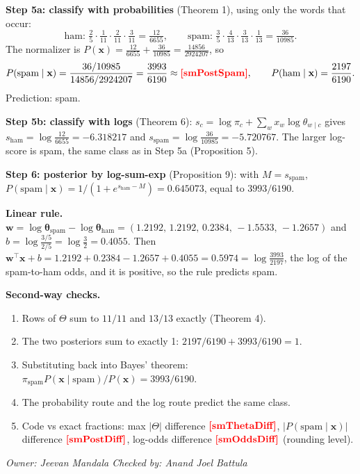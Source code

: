 \documentclass[11pt]{article}
\makeatletter
\newcommand{\fillin}[1]{\textcolor{red}{\textbf{[#1]}}}
\newcommand{\res}[1]{\ifcsname res@#1\endcsname\csname res@#1\endcsname\else\fillin{#1}\fi}
\newcommand{\owner}[2]{\par\noindent\textit{Owner: #1 \hfill Checked by: #2}\par\medskip}
\theoremstyle{plain}
\newcommand{\bx}{\mathbf{x}}
\newcommand{\bw}{\mathbf{w}}
\makeatother
\begin{document}
\textbf{Step 5a: classify with probabilities} (Theorem 1), using only the words that occur:
\[
\text{ham: }\tfrac25\cdot\tfrac1{11}\cdot\tfrac2{11}\cdot\tfrac3{11}=\tfrac{12}{6655},\qquad
\text{spam: }\tfrac35\cdot\tfrac4{13}\cdot\tfrac3{13}\cdot\tfrac1{13}=\tfrac{36}{10985}.
\]
The normalizer is $P(\bx)=\frac{12}{6655}+\frac{36}{10985}=\frac{14856}{2924207}$, so
\[
P(\text{spam}\mid\bx)=\frac{36/10985}{14856/2924207}=\frac{3993}{6190}\approx\res{smPostSpam},
\qquad P(\text{ham}\mid\bx)=\frac{2197}{6190}.
\]
Prediction: spam.

\textbf{Step 5b: classify with logs} (Theorem 6): $s_c=\log\pi_c+\sum_wx_w\log\theta_{w\mid c}$ gives
$s_{\text{ham}}=\log\frac{12}{6655}=-6.318217$ and $s_{\text{spam}}=\log\frac{36}{10985}=-5.720767$.
The larger log-score is spam, the same class as in Step 5a (Proposition 5).

\textbf{Step 6: posterior by log-sum-exp} (Proposition 9): with $M=s_{\text{spam}}$,
$P(\text{spam}\mid\bx)=1/(1+e^{s_{\text{ham}}-M})=0.645073$, equal to $3993/6190$.

\textbf{Linear rule.} $\bw=\log\boldsymbol\theta_{\text{spam}}-\log\boldsymbol\theta_{\text{ham}}
=(1.2192,\,1.2192,\,0.2384,\,-1.5533,\,-1.2657)$ and $b=\log\frac{3/5}{2/5}=\log\frac32=0.4055$. Then
$\bw^\top\bx+b=1.2192+0.2384-1.2657+0.4055=0.5974=\log\frac{3993}{2197}$, the log of the spam-to-ham
odds, and it is positive, so the rule predicts spam.

\textbf{Second-way checks.}
\begin{enumerate}[leftmargin=*,itemsep=1pt]
\item Rows of $\Theta$ sum to $11/11$ and $13/13$ exactly (Theorem 4).
\item The two posteriors sum to exactly 1: $2197/6190+3993/6190=1$.
\item Substituting back into Bayes' theorem: $\pi_{\text{spam}}P(\bx\mid\text{spam})/P(\bx)=3993/6190$.
\item The probability route and the log route predict the same class.
\item Code vs exact fractions: max $|\Theta|$ difference $\res{smThetaDiff}$, $|P(\text{spam}\mid\bx)|$
difference $\res{smPostDiff}$, log-odds difference $\res{smOddsDiff}$ (rounding level).
\end{enumerate}
\owner{Jeevan Mandala}{Anand Joel Battula}

\end{document}

